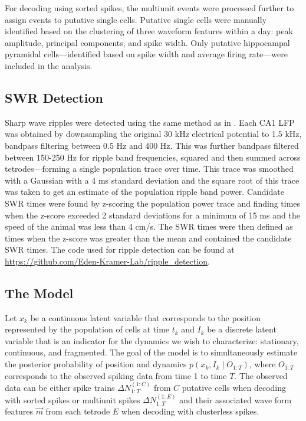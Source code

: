 \documentclass[times, twoside]{zHenriquesLab-StyleBioRxiv}
\begin{document}
For decoding using sorted spikes, the multiunit events were processed further to assign events to putative single cells. Putative single cells were manually identified based on the clustering of three waveform features within a day: peak amplitude, principal components, and spike width. Only putative hippocampal pyramidal cells---identified based on spike width and average firing rate---were included in the analysis.

\subsection*{SWR Detection}
Sharp wave ripples were detected using the same method as in \cite{Kayhippocampalnetworkspatial2016}. Each CA1 LFP was obtained by downsampling the original 30 kHz electrical potential to 1.5 kHz, bandpass filtering between 0.5 Hz and 400 Hz. This was further bandpass filtered between 150-250 Hz for ripple band frequencies, squared and then summed across tetrodes---forming a single population trace over time. This trace was smoothed with a Gaussian with a 4 ms standard deviation and the square root of this trace was taken to get an estimate of the population ripple band power. Candidate SWR times were found by z-scoring the population power trace and finding times when the z-score exceeded 2 standard deviations for a minimum of 15 ms and the speed of the animal was less than 4 cm/s. The SWR times were then defined as times when the z-score was greater than the mean and contained the candidate SWR times. The code used for ripple detection can be found at \url{https://github.com/Eden-Kramer-Lab/ripple_detection}.

\subsection*{The Model}
Let $x_{k}$ be a continuous latent variable that corresponds to the position represented by the population of cells at time $t_k$ and $I_{k}$ be a discrete latent variable that is an indicator for the dynamics we wish to characterize: stationary, continuous, and fragmented. The goal of the model is to simultaneously estimate the posterior probability of position and dynamics $p(x_k, I_k \mid O_{1:T})$, where $O_{1:T}$ corresponds to the observed spiking data from time 1 to time $T$. The observed data can be either spike trains $\Delta N_{1:T}^{(1:C)}$ from $C$ putative cells when decoding with sorted spikes or multiunit spikes $\Delta N_{1:T}^{(1:E)}$ and their associated wave form features $\Vec{m}$ from each tetrode $E$ when decoding with clusterless spikes.
\end{document}
